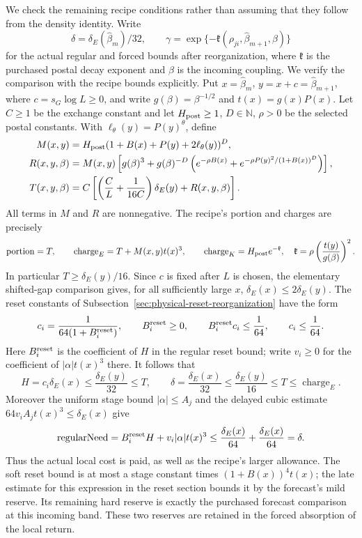 We check the remaining recipe conditions rather than assuming that
they follow from the density identity. Write
\[
 \delta=\delta_E(\widehat\beta_m)/32,\qquad
 \gamma=\exp\{-\mathfrak k(\rho_{ji},\widehat\beta_{m+1},\beta)\}
\]
for the actual regular and forced bounds after reorganization, where
$\mathfrak k$ is the purchased postal decay exponent and $\beta$ is
the incoming coupling. We verify the comparison with the recipe bounds explicitly. Put
$x=\widehat\beta_m$, $y=x+c=\widehat\beta_{m+1}$, where
$c=s_G\log L\ge0$, and write $g(\beta)=\beta^{-1/2}$ and
$t(x)=g(x)P(x)$. Let $C\ge1$ be the exchange constant and let
$H_{\rm post}\ge1$, $D\in\mathbb N$, $\rho>0$ be the selected
postal constants. With $\ell_\theta(y)=P(y)^\theta$, define
\begin{align*}
 M(x,y)&=H_{\rm post}(1+B(x)+P(y)+2\ell_\theta(y))^D,\\
 R(x,y,\beta)&=M(x,y)\left[g(\beta)^3+g(\beta)^{-D}
 \left(e^{-\rho B(x)}+
 e^{-\rho P(y)^2/(1+B(x))^D}\right)\right],\\
 T(x,y,\beta)&=C\left[\left(\frac C L+\frac1{16C}\right)
                  \delta_E(y)+R(x,y,\beta)\right].
\end{align*}
All terms in $M$ and $R$ are nonnegative. The recipe's portion and
charges are precisely
\[
 \operatorname{portion}=T,\qquad
 \operatorname{charge}_E=T+M(x,y)t(x)^3,\qquad
 \operatorname{charge}_K=H_{\rm post}e^{-\mathfrak k},
 \quad \mathfrak k=\rho\left(\frac{t(y)}{g(\beta)}\right)^2.
\]
In particular $T\ge\delta_E(y)/16$. Since $c$ is fixed after $L$
is chosen, the elementary shifted-gap comparison gives, for all
sufficiently large $x$, $\delta_E(x)\le2\delta_E(y)$.
The reset constants of
Subsection~\ref{sec:physical-reset-reorganization} have the form
\[
 c_i=\frac1{64(1+B_i^{\rm reset})},\qquad B_i^{\rm reset}\ge0,
 \qquad B_i^{\rm reset}c_i\le\frac1{64},\qquad c_i\le\frac1{64}.
\]
Here $B_i^{\rm reset}$ is the coefficient of $H$ in the regular reset bound;
write $v_i\ge0$ for the coefficient of $|\alpha|t(x)^3$ there.
It follows that
\[
 H=c_i\delta_E(x)\le\frac{\delta_E(y)}{32}\le T,
 \qquad
 \delta=\frac{\delta_E(x)}{32}\le\frac{\delta_E(y)}{16}
                                      \le T\le\operatorname{charge}_E.
\]
Moreover the uniform stage bound $|\alpha|\le A_j$ and the delayed
cubic estimate $64v_i A_jt(x)^3\le\delta_E(x)$ give
\[
 \operatorname{regularNeed}=B_i^{\rm reset}H+v_i|\alpha|t(x)^3
               \le\frac{\delta_E(x)}{64}
                   +\frac{\delta_E(x)}{64}=\delta.
\]
Thus the actual local cost is paid, as well as the recipe's larger
allowance. The soft reset bound is at most a stage constant times
$(1+B(x))^4t(x)$; the late estimate for this expression in the reset
section bounds it by the forecast's mild reserve. Its remaining hard
reserve is exactly the purchased forecast comparison at this incoming
band. These two reserves are retained in the forced absorption of the
local return.

